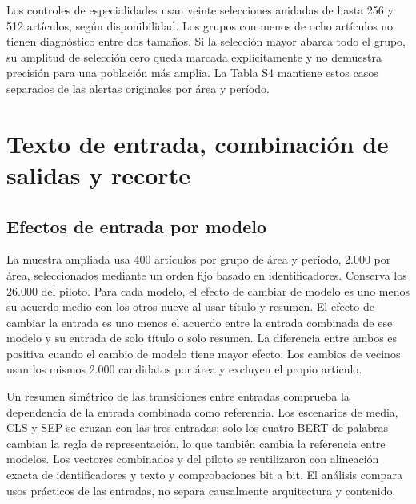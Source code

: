 \documentclass[12pt]{article}
\begin{document}
Los controles de especialidades usan veinte selecciones anidadas de hasta 256 y 512 artículos, según disponibilidad. Los grupos con menos de ocho artículos no tienen diagnóstico entre dos tamaños. Si la selección mayor abarca todo el grupo, su amplitud de selección cero queda marcada explícitamente y no demuestra precisión para una población más amplia. La Tabla S4 mantiene estos casos separados de las alertas originales por área y período.

\FloatBarrier

\section{Texto de entrada, combinación de salidas y recorte}
\subsection{Efectos de entrada por modelo}
La muestra ampliada usa 400 artículos por grupo de área y período, 2.000 por área, seleccionados mediante un orden fijo basado en identificadores. Conserva los 26.000 del piloto. Para cada modelo, el efecto de cambiar de modelo es uno menos su acuerdo medio con los otros nueve al usar título y resumen. El efecto de cambiar la entrada es uno menos el acuerdo entre la entrada combinada de ese modelo y su entrada de solo título o solo resumen. La diferencia entre ambos es positiva cuando el cambio de modelo tiene mayor efecto. Los cambios de vecinos usan los mismos 2.000 candidatos por área y excluyen el propio artículo.

Un resumen simétrico de las transiciones entre entradas comprueba la dependencia de la entrada combinada como referencia. Los escenarios de media, CLS y SEP se cruzan con las tres entradas; solo los cuatro BERT de palabras cambian la regla de representación, lo que también cambia la referencia entre modelos. Los vectores combinados y del piloto se reutilizaron con alineación exacta de identificadores y texto y comprobaciones bit a bit. El análisis compara usos prácticos de las entradas, no separa causalmente arquitectura y contenido.

\FloatBarrier
\end{document}
